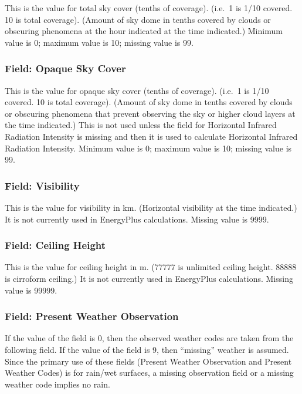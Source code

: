 This is the value for total sky cover (tenths of coverage). (i.e.~1 is 1/10 covered. 10 is total coverage). (Amount of sky dome in tenths covered by clouds or obscuring phenomena at the hour indicated at the time indicated.) Minimum value is 0; maximum value is 10; missing value is 99.

\subsubsection{Field: Opaque Sky Cover}\label{field-opaque-sky-cover}

This is the value for opaque sky cover (tenths of coverage). (i.e.~1 is 1/10 covered. 10 is total coverage). (Amount of sky dome in tenths covered by clouds or obscuring phenomena that prevent observing the sky or higher cloud layers at the time indicated.) This is not used unless the field for Horizontal Infrared Radiation Intensity is missing and then it is used to calculate Horizontal Infrared Radiation Intensity. Minimum value is 0; maximum value is 10; missing value is 99.

\subsubsection{Field: Visibility}\label{field-visibility}

This is the value for visibility in km. (Horizontal visibility at the time indicated.) It is not currently used in EnergyPlus calculations. Missing value is 9999.

\subsubsection{Field: Ceiling Height}\label{field-ceiling-height}

This is the value for ceiling height in m. (77777 is unlimited ceiling height. 88888 is cirroform ceiling.) It is not currently used in EnergyPlus calculations. Missing value is 99999.

\subsubsection{Field: Present Weather Observation}\label{field-present-weather-observation}

If the value of the field is 0, then the observed weather codes are taken from the following field. If the value of the field is 9, then ``missing'' weather is assumed. Since the primary use of these fields (Present Weather Observation and Present Weather Codes) is for rain/wet surfaces, a missing observation field or a missing weather code implies no rain.

